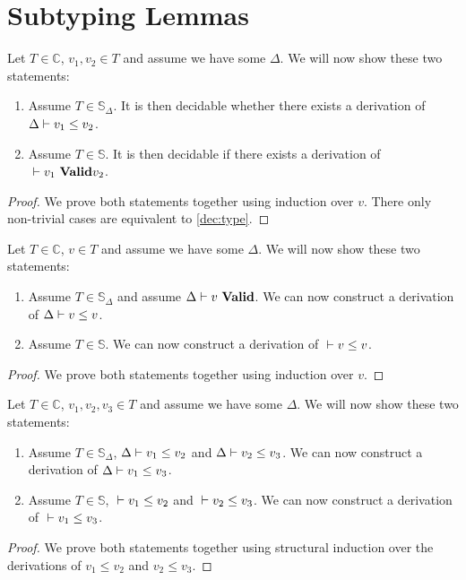 \section{Subtyping Lemmas}


\begin{lemma}
  Let $T \in \mathbb{C}$, $v_1, v_2 \in T$ and assume we have some $\Delta$. We
  will now show these two statements:
  \begin{enumerate}
  \item Assume $T \in \mathbb{S}_\Delta$. It is then decidable whether there
    exists a derivation of ${\Delta} |- {v_1} \le {v_2}$.
  \item Assume $T \in \mathbb{S}$. It is then decidable if there exists a
    derivation of ${} |- {v_1}\ \mathbf{Valid}{v_2}$.
  \end{enumerate}
\end{lemma}
\label{dec:subtype}
\begin{proof}
  We prove both statements together using induction over $v$. There only
  non-trivial cases are equivalent to \autoref{dec:type}.
\end{proof}

\begin{lemma}
  Let $T \in \mathbb{C}$, $v \in T$ and assume we have some $\Delta$. We
  will now show these two statements:
  \begin{enumerate}
  \item Assume $T \in \mathbb{S}_\Delta$ and assume ${\Delta} |- {v}\ \mathbf{Valid}$. We can
    now construct a derivation of ${\Delta} |- {v} \le {v}$.
  \item Assume $T \in \mathbb{S}$. We can now construct a derivation of
    ${} |- {v} \le {v}$.
  \end{enumerate}
\end{lemma}
\begin{proof}
  We prove both statements together using induction over $v$.
\end{proof}

\begin{lemma}
  Let $T \in \mathbb{C}$, $v_1, v_2, v_3 \in T$ and assume we have some
  $\Delta$. We will now show these two statements:
  \begin{enumerate}
  \item Assume $T \in \mathbb{S}_\Delta$, ${\Delta} |- {v_1} \le {v_2}$ and
    ${\Delta} |- {v_2} \le {v_3}$. We can now construct a derivation of
    ${\Delta} |- {v_1} \le {v_3}$.
  \item Assume $T \in \mathbb{S}$, ${} |- {v_1} \le {v_2}$ and
    ${} |- {v_2} \le {v_3}$. We can now construct a derivation of
    ${} |- {v_1} \le {v_3}$.
  \end{enumerate}
\end{lemma}
\begin{proof}
  We prove both statements together using structural induction over the
  derivations of $v_1\le v_2$ and $v_2 \le v_3$.
\end{proof}

